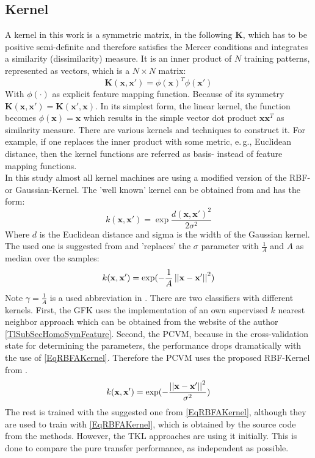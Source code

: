 \subsection{Kernel}\label{EmSubSecKernel}
A kernel in this work is a symmetric matrix, in the following $\mathbf{K}$, which has to be positive semi-definite and therefore satisfies the Mercer conditions and integrates a similarity (dissimilarity) measure.
It is an inner product of $N$ training patterns, represented as vectors, which is a $N \times N$ matrix:
\begin{equation}
	\mathbf{K}(\mathbf{x},\mathbf{x'}) = \phi(\mathbf{x})^T\phi(\mathbf{x'})
\end{equation}
With $\phi(\cdot)$ as explicit feature mapping function.
Because of its symmetry $\mathbf{K}(\mathbf{x},\mathbf{x'})=\mathbf{K}(\mathbf{x'},\mathbf{x})$.
In its simplest form, the linear kernel, the function becomes $\phi(\mathbf{x}) = \mathbf{x}$ which results in the simple vector dot product $\mathbf{x}\mathbf{x}^T$ as similarity measure. There are various kernels and techniques to construct it. For example, if one replaces the inner product with some metric, e.\,g., Euclidean distance, then the kernel functions are referred as basis- instead of feature mapping functions.\cite[p. 291-296, 329]{Bishop.2009}\\
In this study almost all kernel machines are using a modified version of the \ac{RBF}- or Gaussian-Kernel.
The 'well known' kernel can be obtained from \cite[p. 17]{Vert.2004} and has the form:
\begin{equation}\label{EqRBFOriginalKernel}
	k(\mathbf{x},\mathbf{x}') = \exp\frac{d(\mathbf{x},\mathbf{x}')^2}{2\sigma^2}
\end{equation}
Where $d$ is the Euclidean distance and sigma is the width of the Gaussian kernel.\\
The used one is suggested from \cite{Duan.2012} and 'replaces' the $\sigma$ parameter with $\frac{1}{A}$ and $A$ as median over the samples: 
\begin{equation}\label{EqRBFAKernel}
	k(\mathbf{x},\mathbf{x'}) = \exp(-\frac{1}{A}\left\vert\left\vert\mathbf{x}-\mathbf{x'}\right\vert\right\vert^2)
\end{equation} 
Note $\gamma = \frac{1}{A}$ is a used abbreviation in \cite{Long.2015}.
There are two classifiers with different kernels.
First, the \acs{GFK} uses the implementation of an own supervised $k$ nearest neighbor approach which can be obtained from the website of the author \ref{TlSubSecHomoSymFeature}.
Second, the \acs{PCVM}, because in the cross-validation state for determining the parameters, the performance drops dramatically with the use of \eqref{EqRBFAKernel}.
Therefore the \acs{PCVM} uses the proposed \acs{RBF}-Kernel from \cite{Chen.2009}. 
\begin{equation}\label{RBFKernelPCVM}
k(\mathbf{x},\mathbf{x'}) = \exp(-\frac{\left\vert\left\vert\mathbf{x}-\mathbf{x'}\right\vert\right\vert^2}{\sigma^2})
\end{equation}
The rest is trained with the suggested one from \eqref{EqRBFAKernel}, although they are used to train with \eqref{EqRBFAKernel}, which is obtained by the source code from the methods.
However, the \acs{TKL} approaches are using it initially.
This is done to compare the pure transfer performance, as independent as possible.

